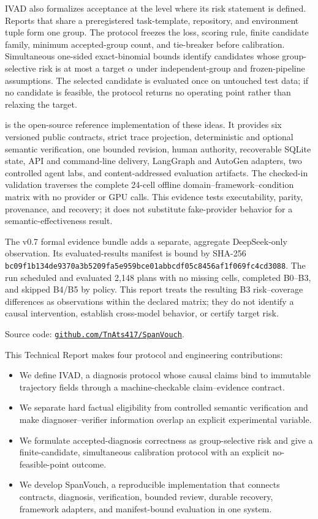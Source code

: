IVAD also formalizes acceptance at the level where its risk statement is
defined. Reports that share a preregistered task-template, repository, and
environment tuple form one group. The protocol freezes the loss, scoring rule,
finite candidate family, minimum accepted-group count, and tie-breaker before
calibration. Simultaneous one-sided exact-binomial bounds identify candidates
whose group-selective risk is at most a target $\alpha$ under independent-group
and frozen-pipeline assumptions. The selected candidate is evaluated once on
untouched test data; if no candidate is feasible, the protocol returns no
operating point rather than relaxing the target.

\system is the open-source reference implementation of these ideas. It
provides six versioned public contracts, strict trace projection, deterministic
and optional semantic verification, one bounded revision, human authority,
recoverable SQLite state, API and command-line delivery, LangGraph and AutoGen
adapters, two controlled agent labs, and content-addressed evaluation
artifacts. The checked-in validation traverses the complete 24-cell offline
domain--framework--condition matrix with no provider or GPU calls. This
evidence tests executability, parity, provenance, and recovery; it does not
substitute fake-provider behavior for a semantic-effectiveness result.

The v0.7 formal evidence bundle adds a separate, aggregate DeepSeek-only
observation. Its evaluated-results manifest is bound by SHA-256
\nolinkurl{bc09f1b134de9370a3b5209fa5e959bce01abbcdf05c8456af1f069fc4cd3088}.
The run scheduled and evaluated 2,148 plans with no missing cells, completed
B0--B3, and skipped B4/B5 by policy. This report treats the resulting B3
risk--coverage differences as observations within the declared matrix; they do
not identify a causal intervention, establish cross-model behavior, or certify
target risk.

\begin{anonsuppress}
Source code: \href{https://github.com/TnAts417/SpanVouch}
{\nolinkurl{github.com/TnAts417/SpanVouch}}.
\end{anonsuppress}

This Technical Report makes four protocol and engineering contributions:
\begin{itemize}
    \item We define IVAD, a diagnosis protocol whose causal claims bind to
    immutable trajectory fields through a machine-checkable claim--evidence
    contract.
    \item We separate hard factual eligibility from controlled semantic
    verification and make diagnoser--verifier information overlap an explicit
    experimental variable.
    \item We formulate accepted-diagnosis correctness as group-selective risk
    and give a finite-candidate, simultaneous calibration protocol with an
    explicit no-feasible-point outcome.
    \item We develop SpanVouch, a reproducible implementation that connects
    contracts, diagnosis, verification, bounded review, durable recovery,
    framework adapters, and manifest-bound evaluation in one system.
\end{itemize}
